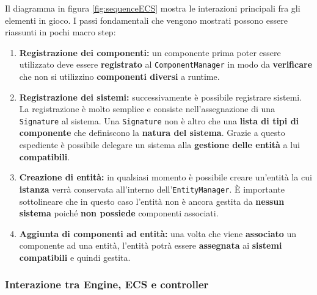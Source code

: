 Il diagramma in figura \ref{fig:sequenceECS} mostra le interazioni principali fra gli elementi in gioco. I passi fondamentali che vengono mostrati possono essere riassunti in pochi macro step:
\begin{enumerate}
	\item{\textbf{Registrazione dei componenti:}} un componente prima poter essere utilizzato deve essere \textbf{registrato} al \texttt{ComponentManager} in modo da \textbf{verificare} che non si utilizzino \textbf{componenti diversi} a runtime.
	\item{\textbf{Registrazione dei sistemi:}} successivamente è possibile registrare sistemi. La registrazione è molto semplice e consiste nell'assegnazione di una \texttt{Signature} al sistema. Una \texttt{Signature} non è altro che una \textbf{lista di tipi di componente} che definiscono la \textbf{natura del sistema}. Grazie a questo espediente è possibile delegare un sistema alla \textbf{gestione delle entità} a lui \textbf{compatibili}.
	\item{\textbf{Creazione di entità:}} in qualsiasi momento è possibile creare un'entità la cui \textbf{istanza} verrà conservata all'interno dell'\texttt{EntityManager}. È importante sottolineare che in questo caso l'entità non è ancora gestita da \textbf{nessun sistema} poiché \textbf{non possiede} componenti associati.
	\item{\textbf{Aggiunta di componenti ad entità:}} una volta che viene \textbf{associato} un componente ad una entità, l'entità potrà essere \textbf{assegnata} ai \textbf{sistemi compatibili} e quindi gestita.
\end{enumerate}


	\subsubsection{Interazione tra Engine, ECS e controller}
	 
